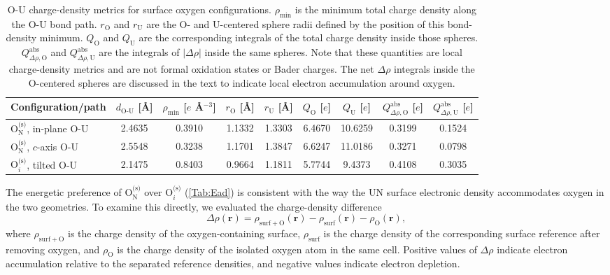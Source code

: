 \documentclass[preprint,12pt,sort&compress]{elsarticle}
\newcommand{\?}{\stackrel{?}{=}}
\begin{document}
\begin{table}[h!]
\centering
\scriptsize
\caption{
O-U charge-density metrics for surface oxygen configurations.
$\rho_\mathrm{min}$ is the minimum total charge density along the O-U bond path.
$r_\mathrm{O}$ and $r_\mathrm{U}$ are the O- and U-centered sphere radii defined by the position of this bond-density minimum.
$Q_\mathrm{O}$ and $Q_\mathrm{U}$ are the corresponding integrals of the total charge density inside those spheres.
$Q^\mathrm{abs}_{\Delta\rho,\mathrm{O}}$ and $Q^\mathrm{abs}_{\Delta\rho,\mathrm{U}}$ are the integrals of $|\Delta\rho|$ inside the same spheres.
Note that these quantities are local charge-density metrics and are not formal oxidation states or Bader charges.
The net $\Delta\rho$ integrals inside the O-centered spheres are discussed in the text to indicate local electron accumulation around oxygen.
}
\begin{tabular}{lcccccccc}
\hline
Configuration/path &
$d_{\text{O-U}}$ [\AA{}] &
$\rho_\mathrm{min}$ [$e$ \AA{}$^{-3}$] &
$r_\mathrm{O}$ [\AA{}] &
$r_\mathrm{U}$ [\AA{}] &
$Q_\mathrm{O}$ [$e$] &
$Q_\mathrm{U}$ [$e$] &
$Q^\mathrm{abs}_{\Delta\rho,\mathrm{O}}$ [$e$] &
$Q^\mathrm{abs}_{\Delta\rho,\mathrm{U}}$ [$e$]
\\
\hline
$\mathrm{O}_{\mathrm{N}}^{\text{(s)}}$, in-plane O-U & 2.4635 & 0.3910 & 1.1332 & 1.3303 & 6.4670 & 10.6259 & 0.3199 & 0.1524 \\
$\mathrm{O}_{\mathrm{N}}^{\text{(s)}}$, $c$-axis O-U & 2.5548 & 0.3238 & 1.1701 & 1.3847 & 6.6247 & 11.0186 & 0.3271 & 0.0798 \\
$\mathrm{O}_i^{\text{(s)}}$, tilted O-U & 2.1475 & 0.8403 & 0.9664 & 1.1811 & 5.7744 & 9.4373 & 0.4108 & 0.3035 \\
\hline
\end{tabular}
\label{Tab:OU_charge_density_metrics}
\end{table}

The energetic preference of $\mathrm{O}_{\mathrm{N}}^{\text{(s)}}$ over $\mathrm{O}_i^{\text{(s)}}$ (\cref{Tab:Ead}) is consistent with the way the UN surface electronic density accommodates oxygen in the two geometries. To examine this directly, we evaluated the charge-density difference
\begin{equation}
\Delta\rho(\mathbf{r}) = \rho_{\mathrm{surf+O}}(\mathbf{r}) - \rho_{\mathrm{surf}}(\mathbf{r}) - \rho_{\mathrm{O}}(\mathbf{r}),
\label{Eq:drho}
\end{equation}
where $\rho_{\mathrm{surf+O}}$ is the charge density of the oxygen-containing surface, $\rho_{\mathrm{surf}}$ is the charge density of the corresponding surface reference after removing oxygen, and $\rho_{\mathrm{O}}$ is the charge density of the isolated oxygen atom in the same cell. Positive values of $\Delta\rho$ indicate electron accumulation relative to the separated reference densities, and negative values indicate electron depletion.
\end{document}
